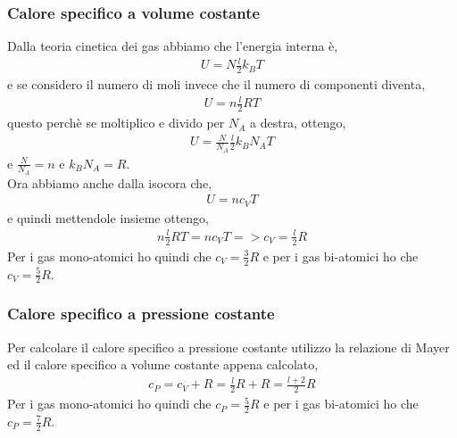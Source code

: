             \subsubsection{Calore specifico a volume costante}
                Dalla teoria cinetica dei gas abbiamo che l'energia interna è,
                \begin{align*}
                    U = N\frac{l}{2}k_BT
                \end{align*}
                e se considero il numero di moli invece che il numero di componenti diventa,
                \begin{align*}
                    U = n\frac{l}{2}RT
                \end{align*}
                questo perchè se moltiplico e divido per $N_A$ a destra, ottengo,
                \begin{align*}
                    U = \frac{N}{N_A}\frac{l}{2}k_BN_AT
                \end{align*}
                e $\frac{N}{N_A}=n$ e $k_B N_A=R$.\\
                Ora abbiamo anche dalla isocora che,
                \begin{align*}
                    U = nc_VT
                \end{align*}
                e quindi mettendole insieme ottengo,
                \begin{align*}
                    n\frac{l}{2}RT=nc_VT => c_V=\frac{l}{2}R
                \end{align*}
                Per i gas mono-atomici ho quindi che $c_V=\frac{3}{2}R$ e per i gas bi-atomici ho che $c_V=\frac{5}{2}R$.

            \subsubsection{Calore specifico a pressione costante}
                Per calcolare il calore specifico a pressione costante utilizzo la relazione di Mayer ed il calore specifico a volume costante appena calcolato,
                \begin{align*}
                    c_P = c_V + R = \frac{l}{2}R + R = \frac{l + 2}{2}R
                \end{align*}
                Per i gas mono-atomici ho quindi che $c_P=\frac{5}{2}R$ e per i gas bi-atomici ho che $c_P=\frac{7}{2}R$.


